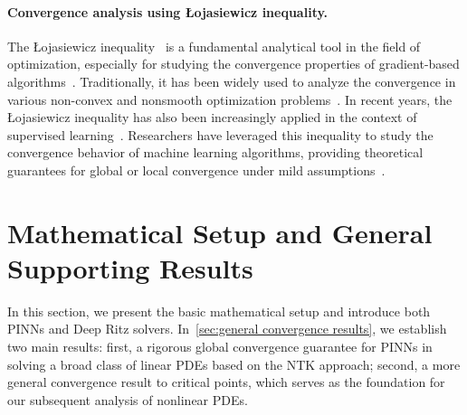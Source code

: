 \documentclass{article}
\begin{document}
\paragraph{Convergence analysis using \L{}ojasiewicz inequality.}
The \L{}ojasiewicz inequality~\citep{haraux2012some} is a fundamental analytical tool in the field of optimization, especially for studying the convergence properties of gradient-based algorithms~\citep{bolte2007lojasiewicz,alaa2013convergence}. 
Traditionally, it has been widely used to analyze the convergence in various non-convex and nonsmooth optimization problems~\citep{schneider2015convergence,attouch2010proximal,karimi2016linear}. 
In recent years, the \L{}ojasiewicz inequality has also been increasingly applied in the context of supervised learning~\citep{forti2006convergence,li2023convergence}. 
Researchers have leveraged this inequality to study the convergence behavior of machine learning algorithms, providing theoretical guarantees for global or local convergence under mild assumptions~\citep{lee2016gradient,ahmadova2023convergence}. 


\section{Mathematical Setup and General Supporting Results} \label{sec:pre}
In this section, we present the basic mathematical setup and introduce both PINNs and Deep Ritz solvers. 
In~\cref{sec:general convergence results}, we establish two main results: first, a rigorous global convergence guarantee for PINNs in solving a broad class of linear PDEs based on the NTK approach; second, a more general convergence result to critical points, which serves as the foundation for our subsequent analysis of nonlinear PDEs.
\end{document}
